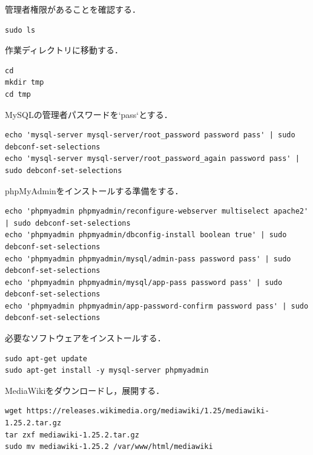 管理者権限があることを確認する．
{\small
\begin{verbatim}
sudo ls
\end{verbatim}}


作業ディレクトリに移動する．
{\small
\begin{verbatim}
cd
mkdir tmp
cd tmp
\end{verbatim}}

MySQLの管理者パスワードを`pass`とする．
{\small
\begin{verbatim}
echo 'mysql-server mysql-server/root_password password pass' | sudo debconf-set-selections
echo 'mysql-server mysql-server/root_password_again password pass' | sudo debconf-set-selections
\end{verbatim}}
 phpMyAdminをインストールする準備をする．
{\small
\begin{verbatim}
echo 'phpmyadmin phpmyadmin/reconfigure-webserver multiselect apache2' | sudo debconf-set-selections
echo 'phpmyadmin phpmyadmin/dbconfig-install boolean true' | sudo debconf-set-selections
echo 'phpmyadmin phpmyadmin/mysql/admin-pass password pass' | sudo debconf-set-selections
echo 'phpmyadmin phpmyadmin/mysql/app-pass password pass' | sudo debconf-set-selections
echo 'phpmyadmin phpmyadmin/app-password-confirm password pass' | sudo debconf-set-selections
\end{verbatim}}

必要なソフトウェアをインストールする．
{\small
\begin{verbatim}
sudo apt-get update
sudo apt-get install -y mysql-server phpmyadmin
\end{verbatim}}

MediaWikiをダウンロードし，展開する．
{\small
\begin{verbatim}
wget https://releases.wikimedia.org/mediawiki/1.25/mediawiki-1.25.2.tar.gz
tar zxf mediawiki-1.25.2.tar.gz
sudo mv mediawiki-1.25.2 /var/www/html/mediawiki
\end{verbatim}}

